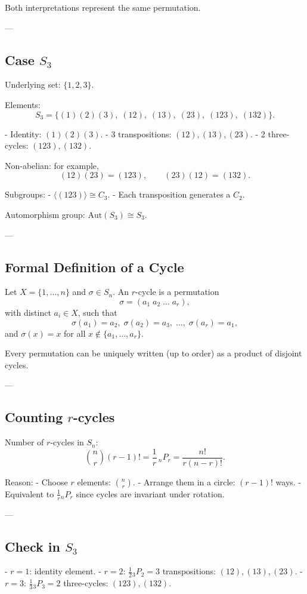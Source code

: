 \documentclass[12pt]{article}
\begin{document}
	Both interpretations represent the same permutation.
	
	---
	
	\subsection*{Case $S_3$}
	Underlying set: $\{1,2,3\}$.  
	
	Elements:
	$$
	S_3 = \{ (1)(2)(3),\; (12),\; (13),\; (23),\; (123),\; (132)\}.
	$$
	
	- Identity: $(1)(2)(3)$.  
	- 3 transpositions: $(12),(13),(23)$.  
	- 2 three-cycles: $(123),(132)$.  
	
	Non-abelian: for example,
	$$
	(12)(23) = (123), \qquad (23)(12) = (132).
	$$
	
	Subgroups:
	- $\langle (123)\rangle \cong C_3$.  
	- Each transposition generates a $C_2$.  
	
	Automorphism group: $\mathrm{Aut}(S_3) \cong S_3$.
	
	---
	
	\subsection*{Formal Definition of a Cycle}
	Let $X=\{1,\dots,n\}$ and $\sigma \in S_n$.  
	An $r$-cycle is a permutation
	$$
	\sigma = (a_1\; a_2\; \dots\; a_r),
	$$
	with distinct $a_i \in X$, such that
	$$
	\sigma(a_1)=a_2,\; \sigma(a_2)=a_3,\;\dots,\;\sigma(a_r)=a_1,
	$$
	and $\sigma(x)=x$ for all $x \notin \{a_1,\dots,a_r\}$.
	
	Every permutation can be uniquely written (up to order) as a product of disjoint cycles.
	
	---
	
	\subsection*{Counting $r$-cycles}
	Number of $r$-cycles in $S_n$:
	$$
	\binom{n}{r}(r-1)! = \frac{1}{r} \, {}_nP_r = \frac{n!}{r(n-r)!}.
	$$
	
	Reason:  
	- Choose $r$ elements: $\binom{n}{r}$.  
	- Arrange them in a circle: $(r-1)!$ ways.  
	- Equivalent to $\frac{1}{r} {}_nP_r$ since cycles are invariant under rotation.
	
	---
	
	\subsection*{Check in $S_3$}
	- $r=1$: identity element.  
	- $r=2$: $\frac{1}{2} {}_3P_2 = 3$ transpositions: $(12),(13),(23)$.  
	- $r=3$: $\frac{1}{3} {}_3P_3 = 2$ three-cycles: $(123),(132)$.  
	
\end{document}
